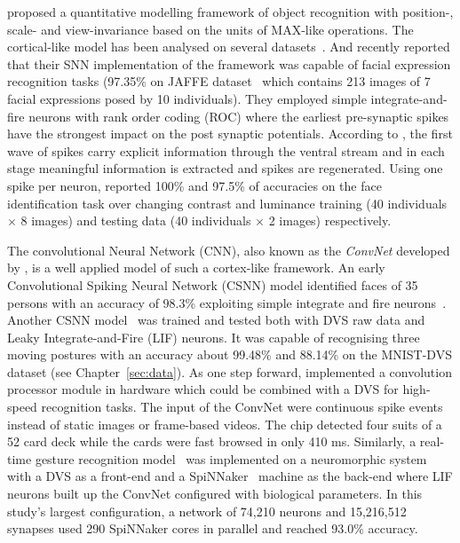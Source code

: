 \cite{riesenhuber1999hierarchical} proposed a quantitative modelling framework of object recognition with position-, scale- and view-invariance based on the units of MAX-like operations.
The cortical-like model has been analysed on several datasets~\citep{serre2007robust}.
And recently \cite{fu_spiking_2012} reported that their SNN implementation of the framework was capable of facial expression recognition tasks (97.35\% on JAFFE dataset~\citep{lyons1998coding} which contains 213 images of 7 facial expressions posed by 10 individuals).
They employed simple integrate-and-fire neurons with rank order coding (ROC) where  the earliest pre-synaptic spikes have the strongest impact on the post synaptic potentials.
According to \cite{vanrullen_surfing_2002}, the first wave of spikes  carry explicit information through the ventral stream and in each stage meaningful information is extracted and spikes are regenerated. 
Using one spike per neuron, \cite{delorme_face_2001} reported 100\% and 97.5\% of accuracies on the face identification task over changing  contrast and luminance training (40 individuals $\times$ 8 images) and testing data (40 individuals $\times$ 2 images) respectively.

The convolutional Neural Network (CNN), also known as the \textit{ConvNet} developed by \cite{lecun1995convolutional}, is a well applied model of such a cortex-like framework.
An early Convolutional Spiking Neural Network (CSNN) model identified faces of 35 persons with an accuracy of 98.3\% exploiting simple integrate and fire neurons~\citep{matsugu2002convolutional}.
Another CSNN model~\citep{zhao_feedforward_2014} was trained and tested both with DVS raw data and Leaky Integrate-and-Fire (LIF) neurons.
It was capable of recognising three moving postures with an accuracy about 99.48\% and 88.14\% on the MNIST-DVS dataset (see Chapter~\ref{sec:data}).
As one step forward, \cite{camunas2012event} implemented a convolution processor module in hardware which could be combined with a DVS for high-speed recognition tasks.
The input of the ConvNet were continuous spike events instead of static images or frame-based videos. 
The chip detected four suits of a 52 card deck while the cards were fast browsed in only 410 ms.
Similarly, a real-time gesture recognition model~\citep{liu2014real} was implemented on a neuromorphic system with a DVS as a front-end and a SpiNNaker~\citep{furber2013overview} machine as the back-end where LIF neurons built up the ConvNet configured with biological parameters.
In this study's largest configuration, a network of 74,210 neurons and 15,216,512 synapses used 290 SpiNNaker cores in parallel and reached 93.0\% accuracy. 

